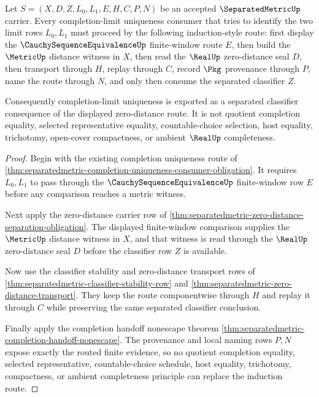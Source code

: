 \begin{theorem}
\label{thm:separatedmetric-cauchy-equivalence-zero-distance-induction}
Let $S=(X,D,Z,L_0,L_1,E,H,C,P,N)$ be an accepted $\SeparatedMetricUp$ carrier. Every completion-limit uniqueness consumer that tries to identify the two limit rows $L_0,L_1$ must proceed by the following induction-style route: first display the $\CauchySequenceEquivalenceUp$ finite-window route $E$, then build the $\MetricUp$ distance witness in $X$, then read the $\RealUp$ zero-distance seal $D$, then transport through $H$, replay through $C$, record $\Pkg$ provenance through $P$, name the route through $N$, and only then consume the separated classifier $Z$.

Consequently completion-limit uniqueness is exported as a separated classifier consequence of the displayed zero-distance route. It is not quotient completion equality, selected representative equality, countable-choice selection, host equality, trichotomy, open-cover compactness, or ambient $\RealUp$ completeness.
\end{theorem}
\begin{proof}
Begin with the existing completion uniqueness route of \autoref{thm:separatedmetric-completion-uniqueness-consumer-obligation}. It requires $L_0,L_1$ to pass through the $\CauchySequenceEquivalenceUp$ finite-window row $E$ before any comparison reaches a metric witness.

Next apply the zero-distance carrier row of \autoref{thm:separatedmetric-zero-distance-separation-obligation}. The displayed finite-window comparison supplies the $\MetricUp$ distance witness in $X$, and that witness is read through the $\RealUp$ zero-distance seal $D$ before the classifier row $Z$ is available.

Now use the classifier stability and zero-distance transport rows of \autoref{thm:separatedmetric-classifier-stability-row} and \autoref{thm:separatedmetric-zero-distance-transport}. They keep the route componentwise through $H$ and replay it through $C$ while preserving the same separated classifier conclusion.

Finally apply the completion handoff nonescape theorem \autoref{thm:separatedmetric-completion-handoff-nonescape}. The provenance and local naming rows $P,N$ expose exactly the routed finite evidence, so no quotient completion equality, selected representative, countable-choice schedule, host equality, trichotomy, compactness, or ambient completeness principle can replace the induction route.
\end{proof}

